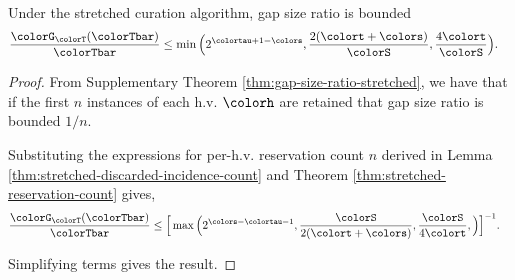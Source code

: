 \begin{theorem}
\label{thm:stretched-gap-size}
Under the stretched curation algorithm, gap size ratio is bounded
\begin{align*}
\frac{\colorG_{\colorT}(\colorTbar)}{\colorTbar}
&\leq
\min\Big(
  2^{\colortau+1-\colors}
  ,
  \frac{2(\colort + \colors)}{\colorS},
  \frac{4\colort}{\colorS}
\Big).
\end{align*}
\end{theorem}
\begin{proof}

From Supplementary Theorem \ref{thm:gap-size-ratio-stretched}, we have that if the first $n$ instances of each h.v. $\colorh$ are retained that gap size ratio is bounded $1/n$.

Substituting the expressions for per-h.v. reservation count $n$ derived in Lemma \ref{thm:stretched-discarded-incidence-count} and Theorem \ref{thm:stretched-reservation-count} gives,
\begin{align*}
  \frac{\colorG_{\colorT}(\colorTbar)}{\colorTbar}
  &\leq
  \Big[
    \max\Big(
      2^{\colors - \colortau - 1},
      \frac{\colorS}{2(\colort + \colors)},
      \frac{\colorS}{4\colort},
    \Big)
  \Big]^{-1}.
\end{align*}

Simplifying terms gives the result.

\end{proof}
